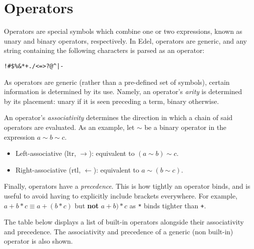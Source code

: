 \section{Operators}\label{sec:operators}

Operators are special symbols which combine one or two expressions, known as unary and binary operators, respectively.
In Edel, operators are generic, and any string containing the following characters is parsed as an operator:

\begin{center}
    \texttt{!\#\$\%\&*+./<=>?@{\string^}|-~}
\end{center}

As operators are generic (rather than a pre-defined set of symbols), certain information is determined by its use.
Namely, an operator's \textit{arity} is determined by its placement: unary if it is seen preceding a term, binary otherwise.

An operator's \textit{associativity} determines the direction in which a chain of said operators are evaluated.
As an example, let \(\sim\) be a binary operator in the expression \(a \sim b \sim c\).
\begin{itemize}
    \item Left-associative (ltr, \(\longrightarrow\)): equivalent to \((a \sim b) \sim c\).
    \item Right-associative (rtl, \(\longleftarrow\)): equivalent to \(a \sim (b \sim c)\).
\end{itemize}

Finally, operators have a \textit{precedence}.
This is how tightly an operator binds, and is useful to avoid having to explicitly include brackets everywhere.
For example, \(a + b * c \equiv a + (b * c)\) but \textbf{not} \(a + b) * c\) as \texttt{*} binds tighter than \texttt{+}.

The table below displays a list of built-in operators alongside their associativity and precedence.
The associativity and precedence of a generic (non built-in) operator is also shown.

